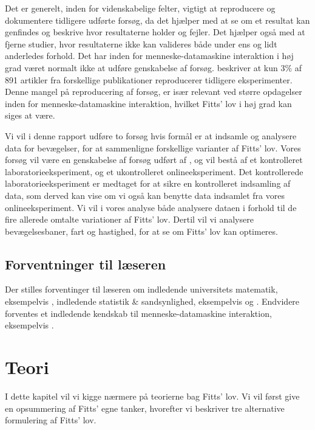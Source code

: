 Det er generelt, inden for videnskabelige felter, vigtigt at reproducere og dokumentere tidligere udførte forsøg, da det hjælper med at se om et resultat kan genfindes og beskrive hvor resultaterne holder og fejler. Det hjælper også med at fjerne studier, hvor resultaterne ikke kan valideres både under ens og lidt anderledes forhold\cite{hornbaek2014}. Det har inden for menneske-datamaskine interaktion i høj grad været normalt ikke at udføre genskabelse af forsøg. \cite{hornbaek2014} beskriver at kun $3\%$ af 891 artikler fra forskellige publikationer reproducerer tidligere eksperimenter. Denne mangel på reproducering af forsøg, er især relevant ved større opdagelser inden for menneske-datamaskine interaktion, hvilket Fitts' lov i høj grad kan siges at være.

Vi vil i denne rapport udføre to forsøg hvis formål er at indsamle og analysere data for bevægelser, for at sammenligne forskellige varianter af Fitts' lov. Vores forsøg vil være en genskabelse af forsøg udført af \cite{accot1997, goldberg2015}, og vil bestå af et kontrolleret laboratorieeksperiment, og et ukontrolleret onlineeksperiment. Det kontrollerede laboratorieeksperiment er medtaget for at sikre en kontrolleret indsamling af data, som derved kan vise om vi også kan benytte data indsamlet fra vores onlineeksperiment. Vi vil i vores analyse både analysere dataen i forhold til de fire allerede omtalte variationer af Fitts' lov. Dertil vil vi analysere bevægelsesbaner, fart og hastighed, for at se om Fitts' lov kan optimeres.\\

\section*{Forventninger til læseren}
Der stilles forventinger til læseren om indledende universitets matematik, eksempelvis \cite{kolman2008}, indledende statistik \& sandsynlighed, eksempelvis \cite{ditlevsen2011} og \cite{soerensen2003}. Endvidere forventes et indledende kendskab til menneske-datamaskine interaktion, eksempelvis \cite{hartson2012}.

\chapter*{Teori}
I dette kapitel vil vi kigge nærmere på teorierne bag Fitts' lov. Vi vil først give en opsummering af Fitts' egne tanker, hvorefter vi beskriver tre alternative formulering af Fitts' lov.

